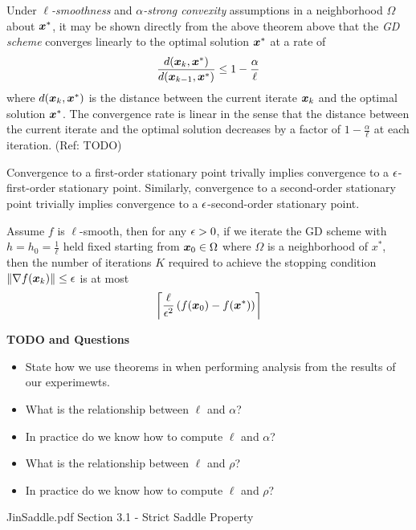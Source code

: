 \documentclass[11pt]{article}
\begin{document}
        \begin{remark}
            Under \emph{$\ell$-smoothness} and \emph{$\alpha$-strong convexity} assumptions
            in a neighborhood $\Omega$ about $\bm{x}^*$, it may be shown directly from 
            the above theorem above that the \emph{GD scheme} converges linearly to 
            the optimal solution $\bm{x}^*$ at a rate of
            $$
                \frac{d(\bm{x}_k, \bm{x}^*)}{d(\bm{x}_{k-1}, \bm{x}^*)} \leq 1 - \frac{\alpha}{\ell}
            $$
            where $d(\bm{x}_k, \bm{x}^*)$ is the distance between the current iterate $\bm{x}_k$ and 
            the optimal solution $\bm{x}^*$. The convergence rate is linear in the sense that the 
            distance between the current iterate and the optimal solution decreases by a factor of 
            $1 - \frac{\alpha}{\ell}$ at each iteration. (Ref: TODO)
        \end{remark}

        \begin{remark}
            Convergence to a first-order stationary point trivally
            implies convergence to a $\epsilon$-first-order stationary point.
            Similarly, convergence to a second-order stationary point trivially
            implies convergence to a $\epsilon$-second-order stationary point.
        \end{remark}

        \medskip

        \begin{theorem}
            Assume $f$ is $\ell$-smooth, then for any $\epsilon > 0$, if we iterate
            the GD scheme with $h = h_0 = \frac{1}{\ell}$ held fixed starting from
            $\bm{x}_0 \in \Omega$ where $\Omega$ is a neighborhood of $x^*$,
            then the number of iterations $K$ required to achieve the stopping condition
            $\| \nabla f(\bm{x}_k) \| \leq \epsilon$ is at most
            $$
                \left\lceil \frac{\ell}{\epsilon^{2}} \, (f(\bm{x}_0) - f(\bm{x}^*)) \right\rceil
            $$
        \end{theorem}

        \begin{remark}
            \textbf{TODO and Questions}
            \begin{itemize}
                \item State how we use theorems in when performing analysis from
                the results of our experimewts.
                \item What is the relationship between $\ell$ and $\alpha$?
                \item In practice do we know how to compute $\ell$ and $\alpha$?
                \item What is the relationship between $\ell$ and $\rho$?
                \item In practice do we know how to compute $\ell$ and $\rho$?
            \end{itemize}
        \end{remark}


    \begin{remark}
        JinSaddle.pdf Section 3.1 - Strict Saddle Property
    \end{remark}


    
\end{document}
